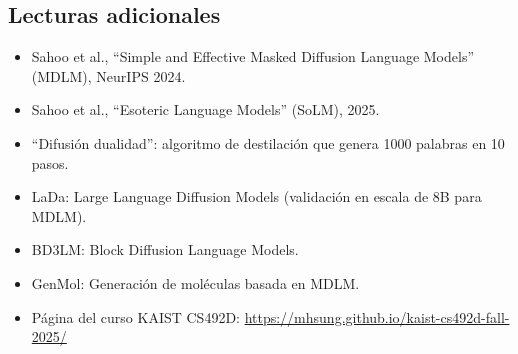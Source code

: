\subsection{Lecturas adicionales}

\begin{itemize}
    \item Sahoo et al., ``Simple and Effective Masked Diffusion Language Models'' (MDLM), NeurIPS 2024.
    \item Sahoo et al., ``Esoteric Language Models'' (SoLM), 2025.
    \item ``Difusión dualidad'': algoritmo de destilación que genera 1000 palabras en 10 pasos.
    \item LaDa: Large Language Diffusion Models (validación en escala de 8B para MDLM).
    \item BD3LM: Block Diffusion Language Models.
    \item GenMol: Generación de moléculas basada en MDLM.
    \item Página del curso KAIST CS492D: \url{https://mhsung.github.io/kaist-cs492d-fall-2025/}
\end{itemize}



